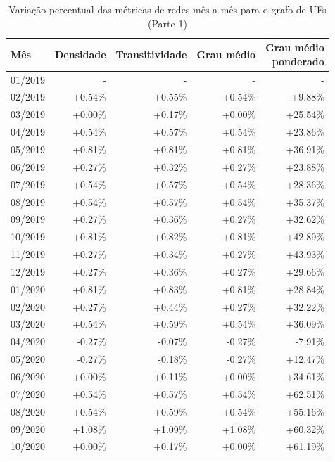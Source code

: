 \begin{table}[htb]
\centering
\caption{Variação percentual das métricas de redes mês a mês para o grafo de UFs (Parte 1)}
\label{tab:metricas-redes-pandemia:grafo-mensal-por-uf1}
\begin{tabular}{l|rrrr}
\toprule
Mês & Densidade & Transitividade & Grau médio & \shortstack{Grau médio\\ponderado} \\
\midrule
01/2019 & - & - & - & - \\
02/2019 & +0.54\% & +0.55\% & +0.54\% &  +9.88\% \\
03/2019 & +0.00\% & +0.17\% & +0.00\% & +25.54\% \\
04/2019 & +0.54\% & +0.57\% & +0.54\% & +23.86\% \\
05/2019 & +0.81\% & +0.81\% & +0.81\% & +36.91\% \\
06/2019 & +0.27\% & +0.32\% & +0.27\% & +23.88\% \\
07/2019 & +0.54\% & +0.57\% & +0.54\% & +28.36\% \\
08/2019 & +0.54\% & +0.57\% & +0.54\% & +35.37\% \\
09/2019 & +0.27\% & +0.36\% & +0.27\% & +32.62\% \\
10/2019 & +0.81\% & +0.82\% & +0.81\% & +42.89\% \\
11/2019 & +0.27\% & +0.34\% & +0.27\% & +43.93\% \\
12/2019 & +0.27\% & +0.36\% & +0.27\% & +29.66\% \\
01/2020 & +0.81\% & +0.83\% & +0.81\% & +28.84\% \\
02/2020 & +0.27\% & +0.44\% & +0.27\% & +32.22\% \\
03/2020 & +0.54\% & +0.59\% & +0.54\% & +36.09\% \\
04/2020 & -0.27\% & -0.07\% & -0.27\% &  -7.91\% \\
05/2020 & -0.27\% & -0.18\% & -0.27\% & +12.47\% \\
06/2020 & +0.00\% & +0.11\% & +0.00\% & +34.61\% \\
07/2020 & +0.54\% & +0.57\% & +0.54\% & +62.51\% \\
08/2020 & +0.54\% & +0.59\% & +0.54\% & +55.16\% \\
09/2020 & +1.08\% & +1.09\% & +1.08\% & +60.32\% \\
10/2020 & +0.00\% & +0.17\% & +0.00\% & +61.19\% \\
\bottomrule
\end{tabular}
\fdadospesquisa
\end{table}

